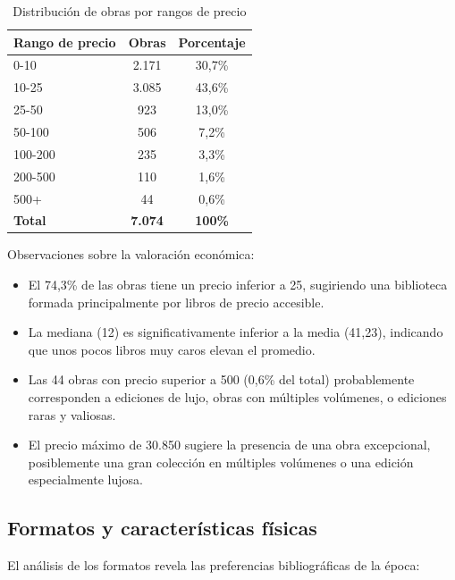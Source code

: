 \documentclass[12pt,a4paper]{article}
\begin{document}
\begin{table}[h]
\centering
\caption{Distribución de obras por rangos de precio}
\label{tab:rangos}
\begin{tabular}{lcc}
\toprule
\textbf{Rango de precio} & \textbf{Obras} & \textbf{Porcentaje} \\
\midrule
0-10 & 2.171 & 30,7\% \\
10-25 & 3.085 & 43,6\% \\
25-50 & 923 & 13,0\% \\
50-100 & 506 & 7,2\% \\
100-200 & 235 & 3,3\% \\
200-500 & 110 & 1,6\% \\
500+ & 44 & 0,6\% \\
\midrule
\textbf{Total} & \textbf{7.074} & \textbf{100\%} \\
\bottomrule
\end{tabular}
\end{table}

Observaciones sobre la valoración económica:

\begin{itemize}
    \item El 74,3\% de las obras tiene un precio inferior a 25, sugiriendo una biblioteca formada principalmente por libros de precio accesible.

    \item La mediana (12) es significativamente inferior a la media (41,23), indicando que unos pocos libros muy caros elevan el promedio.

    \item Las 44 obras con precio superior a 500 (0,6\% del total) probablemente corresponden a ediciones de lujo, obras con múltiples volúmenes, o ediciones raras y valiosas.

    \item El precio máximo de 30.850 sugiere la presencia de una obra excepcional, posiblemente una gran colección en múltiples volúmenes o una edición especialmente lujosa.
\end{itemize}

\subsection{Formatos y características físicas}

El análisis de los formatos revela las preferencias bibliográficas de la época:
\end{document}
